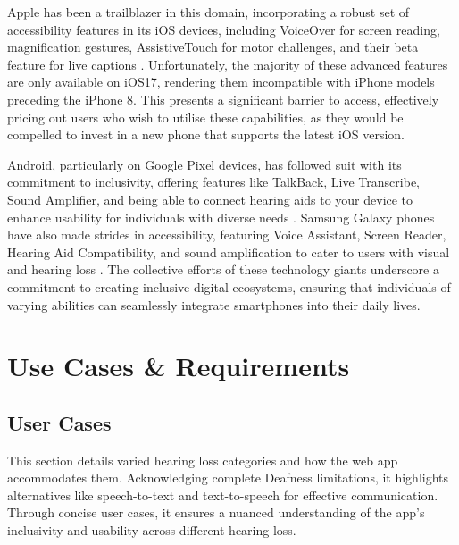 \documentclass{l4proj}
\begin{document}
Apple has been a trailblazer in this domain, incorporating a robust set of accessibility features in its iOS devices, including VoiceOver for screen reading, magnification gestures, AssistiveTouch for motor challenges, and their beta feature for live captions \citep{AppleSupport}. Unfortunately, the majority of these advanced features are only available on iOS17, rendering them incompatible with iPhone models preceding the iPhone 8. This presents a significant barrier to access, effectively pricing out users who wish to utilise these capabilities, as they would be compelled to invest in a new phone that supports the latest iOS version.

Android, particularly on Google Pixel devices, has followed suit with its commitment to inclusivity, offering features like TalkBack, Live Transcribe, Sound Amplifier, and being able to connect hearing aids to your device to enhance usability for individuals with diverse needs \citep{Google}. Samsung Galaxy phones have also made strides in accessibility, featuring Voice Assistant, Screen Reader, Hearing Aid Compatibility, and sound amplification to cater to users with visual and hearing loss \citep{Samsung_uk_2023}. The collective efforts of these technology giants underscore a commitment to creating inclusive digital ecosystems, ensuring that individuals of varying abilities can seamlessly integrate smartphones into their daily lives.

\chapter{Use Cases \& Requirements}
\label{sec:use-cases-and-req}

\section{User Cases}
\label{sec:user-cases}


This section details varied hearing loss categories and how the web app accommodates them. Acknowledging complete Deafness limitations, it highlights alternatives like speech-to-text and text-to-speech for effective communication. Through concise user cases, it ensures a nuanced understanding of the app's inclusivity and usability across different hearing loss.
\end{document}
